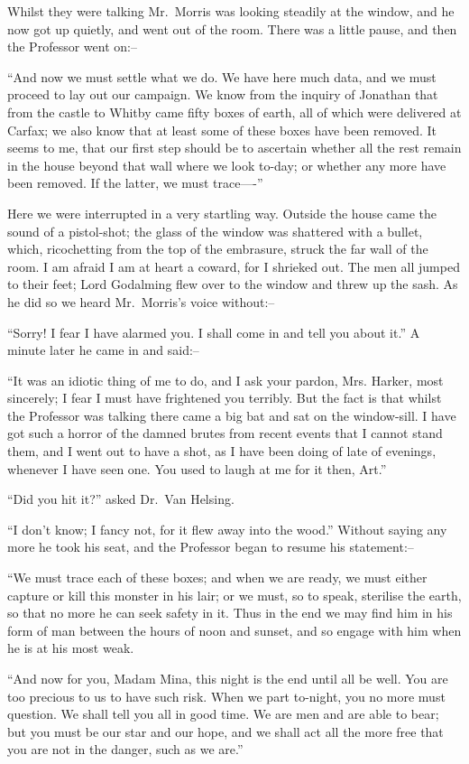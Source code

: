 \documentclass[12pt,openright]{book}
\begin{document}
Whilst they were talking Mr. Morris was looking steadily at the window, and he now got up quietly, and went out of the room. There was a little pause, and then the Professor went on:–

“And now we must settle what we do. We have here much data, and we must proceed to lay out our campaign. We know from the inquiry of Jonathan that from the castle to Whitby came fifty boxes of earth, all of which were delivered at Carfax; we also know that at least some of these boxes have been removed. It seems to me, that our first step should be to ascertain whether all the rest remain in the house beyond that wall where we look to-day; or whether any more have been removed. If the latter, we must trace—-”

Here we were interrupted in a very startling way. Outside the house came the sound of a pistol-shot; the glass of the window was shattered with a bullet, which, ricochetting from the top of the embrasure, struck the far wall of the room. I am afraid I am at heart a coward, for I shrieked out. The men all jumped to their feet; Lord Godalming flew over to the window and threw up the sash. As he did so we heard Mr. Morris’s voice without:–

“Sorry! I fear I have alarmed you. I shall come in and tell you about it.” A minute later he came in and said:–

“It was an idiotic thing of me to do, and I ask your pardon, Mrs. Harker, most sincerely; I fear I must have frightened you terribly. But the fact is that whilst the Professor was talking there came a big bat and sat on the window-sill. I have got such a horror of the damned brutes from recent events that I cannot stand them, and I went out to have a shot, as I have been doing of late of evenings, whenever I have seen one. You used to laugh at me for it then, Art.”

“Did you hit it?” asked Dr. Van Helsing.

“I don’t know; I fancy not, for it flew away into the wood.” Without saying any more he took his seat, and the Professor began to resume his statement:–

“We must trace each of these boxes; and when we are ready, we must either capture or kill this monster in his lair; or we must, so to speak, sterilise the earth, so that no more he can seek safety in it. Thus in the end we may find him in his form of man between the hours of noon and sunset, and so engage with him when he is at his most weak.

“And now for you, Madam Mina, this night is the end until all be well. You are too precious to us to have such risk. When we part to-night, you no more must question. We shall tell you all in good time. We are men and are able to bear; but you must be our star and our hope, and we shall act all the more free that you are not in the danger, such as we are.”
\end{document}
